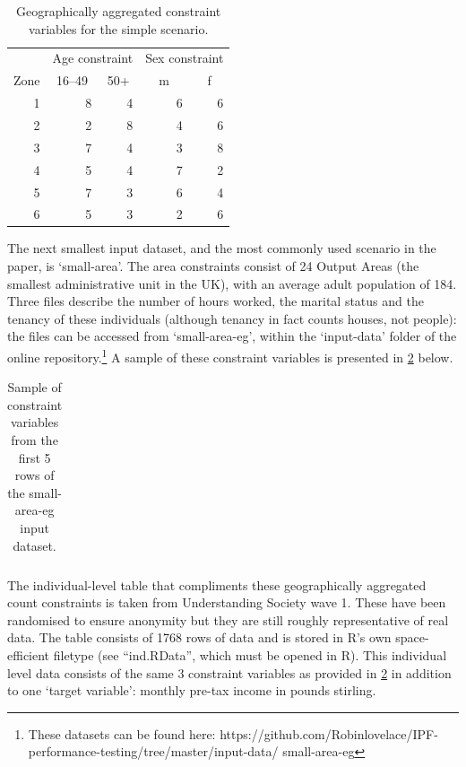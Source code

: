 \documentclass[a4paper,10pt]{article}
\begin{document}
\begin{table}[htbp]
\caption{Geographically aggregated constraint variables for the simple
scenario.}
\begin{center}
\begin{tabular}{rrrrr}
\toprule
\multicolumn{1}{l}{} & \multicolumn{2}{c}{Age constraint} & \multicolumn{2}{c}{Sex constraint} \\
\multicolumn{1}{l}{Zone} & \multicolumn{1}{c}{16--49} & \multicolumn{1}{c}{50+} & \multicolumn{1}{c}{m} & \multicolumn{1}{c}{f} \\
\midrule
1 & 8 & 4 & 6 & 6 \\
2 & 2 & 8 & 4 & 6 \\
3 & 7 & 4 & 3 & 8 \\
4 & 5 & 4 & 7 & 2 \\
5 & 7 & 3 & 6 & 4 \\
6 & 5 & 3 & 2 & 6 \\
\bottomrule
\end{tabular}
\end{center}
\label{t2}
\end{table}

The next smallest input dataset, and the most commonly used scenario in the paper, 
is `small-area'. The area constraints consist of 24 Output Areas (the smallest 
administrative unit in the UK), with an average adult population of 184.
Three files describe the number of hours worked, the marital status and the
tenancy of these 
individuals (although tenancy in fact counts houses, not people): the files can
be accessed from `small-area-eg', within the `input-data' folder of the online
repository.\footnote{These datasets can be found here:
https://github.com/Robinlovelace/IPF-performance-testing/tree/master/input-data/
small-area-eg}
A sample of these constraint variables is presented in \cref{t3} below. %

\begin{table}[htbp]
\caption{Sample of constraint variables from the first 5 rows of the small-area-eg input dataset.}
\begin{center}
\begin{tabular}{rrrrr}
\toprule
\bottomrule
\end{tabular}
\end{center}
\label{t3}
\end{table}

The individual-level table that compliments these geographically aggregated count constraints 
is taken from Understanding Society wave 1. These have been randomised to ensure anonymity
but they are still roughly representative of real data. The table consists of 1768 rows of 
data and is stored in R’s own space-efficient filetype (see ``ind.RData'', which must be opened in 
R). This individual level data consists of the same 3
constraint variables as provided in \cref{t3} in addition
to one `target variable': monthly pre-tax income in pounds stirling. 
\end{document}
